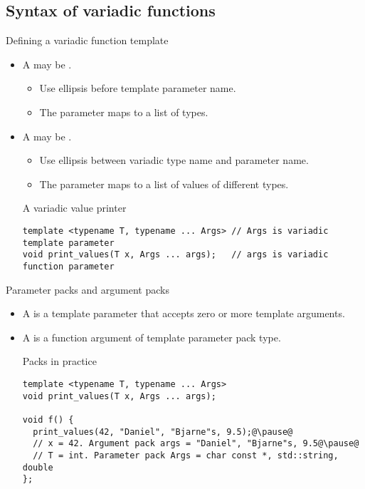 \subsection{Syntax of variadic functions}

\begin{frame}[t,fragile]{Defining a variadic function template}
\begin{itemize}
  \item A  may be .
    \begin{itemize}
      \item Use ellipsis before template parameter name.
      \item The parameter maps to a list of types.
    \end{itemize}

  \item A  may be .
    \begin{itemize}
      \item Use ellipsis between variadic type name and parameter name.
      \item The parameter maps to a list of values of different types.
    \end{itemize}

\begin{block}{A variadic value printer}
\begin{lstlisting}
template <typename T, typename ... Args> // Args is variadic template parameter
void print_values(T x, Args ... args);   // args is variadic function parameter
\end{lstlisting}
\end{block}

\end{itemize}
\end{frame}

\begin{frame}[t,fragile]{Parameter packs and argument packs}
\begin{itemize}
  \item A  is a template parameter that
        accepts zero or more template arguments.

  \pause
  \item A  is a function argument of
        template parameter pack type.

\pause
\begin{block}{Packs in practice}
\begin{lstlisting}[escapechar=@]
template <typename T, typename ... Args>
void print_values(T x, Args ... args);

void f() {
  print_values(42, "Daniel", "Bjarne"s, 9.5);@\pause@
  // x = 42. Argument pack args = "Daniel", "Bjarne"s, 9.5@\pause@
  // T = int. Parameter pack Args = char const *, std::string, double
};
\end{lstlisting}
\end{block}
\end{itemize}
\end{frame}

